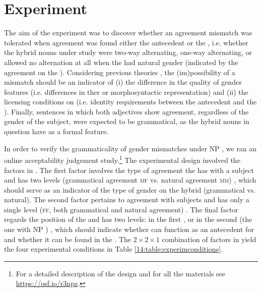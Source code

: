 \documentclass[output=paper,modfonts,newtxmath,hidelinks]{langscibook}
\begin{document}
     
\section{Experiment}

The aim of the experiment was to discover whether an agreement mismatch was tolerated when  agreement was found either the antecedent  or the  , i.e. whether the hybrid nouns under study were two-way alternating, one-way alternating, or allowed no alternation at all when the  had natural  gender  (indicated by the agreement on the ). Considering previous theories \citep{nuneszocca10,bobaljikzocca,merchant14,sudospathas-sub20}, the (im)possibility of a mismatch should be an indicator of (i) the difference in the quality of gender features (i.e. differences in ther  or morphosyntactic representation) and (ii) the licensing conditions on  (i.e. identity requirements between the antecedent and the ). Finally, sentences in which both adjectives show  agreement, regardless of the gender of the subject, were expected to be grammatical, as the hybrid nouns in question have  as a formal feature. 

In order to verify the grammaticality of gender mismatches under NP , we ran an online acceptability judgement study.\footnote{For a detailed description of the design and for all the materials see \url{https://osf.io/r3npz}.} 
The experimental design involved the factors  in . The first factor involves the type of agreement the  has with a  subject and has two levels (grammatical agreement \textsc{mf} vs. natural agreement \textsc{mm}) , which should serve as an indicator of the type of gender on the hybrid  (grammatical vs. natural).
The second factor pertains to agreement with  subjects and has only a single level (\textsc{ff}, both grammatical and natural agreement) . The final factor regards the position of the   and has two levels:
in the first , or in  the second  (the one with NP ) , which should indicate whether  can function as an antecedent for  and whether it can be found in the . The $2\times 2\times 1$ combination of factors in  yield the four experimental conditions in Table \ref{14:table:experimconditions}.
\end{document}
